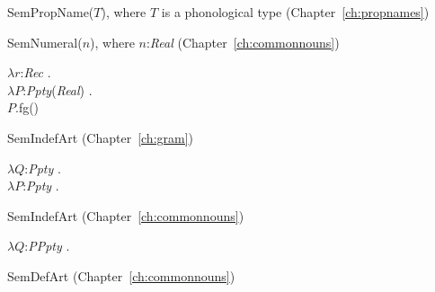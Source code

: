SemPropName($T$), where $T$ is a phonological type
(Chapter~\ref{ch:propnames})


 

SemNumeral($n$), where $n$:\textit{Real}
(Chapter~\ref{ch:commonnouns})

$\lambda r$:\textit{Rec} . \\
\hspace*{1em}$\lambda P$:\textit{Ppty}(\textit{Real}) . \\
\hspace*{2em}$P$.fg()

SemIndefArt (Chapter~\ref{ch:gram})

$\lambda Q$:\textit{Ppty} . \\
\hspace*{1em} $\lambda P$:\textit{Ppty}
. 

SemIndefArt (Chapter~\ref{ch:commonnouns})

$\lambda Q$:\textit{PPpty} . 

SemDefArt (Chapter~\ref{ch:commonnouns})

